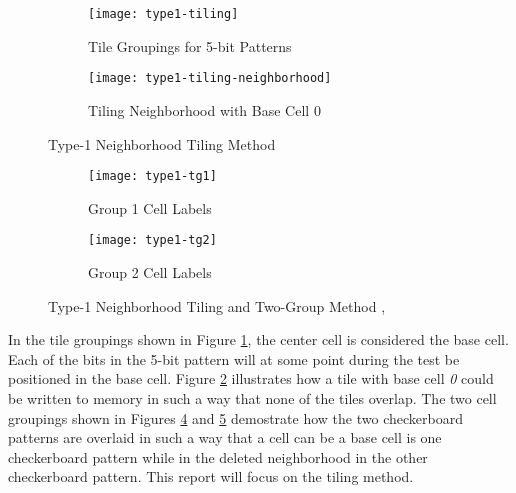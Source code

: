 \begin{figure}[H]
  \centering
  \begin{subfigure}[b]{0.4\textwidth}
    \texttt{[image: type1-tiling]}
    \caption{Tile Groupings for 5-bit Patterns}
    \label{fig:type1-tl}
  \end{subfigure}
  \begin{subfigure}[b]{0.4\textwidth}
    \texttt{[image: type1-tiling-neighborhood]}
    \caption{Tiling Neighborhood with Base Cell 0}
    \label{fig:type1-tlnh}
  \end{subfigure}
  \caption{Type-1 Neighborhood Tiling Method \cite{VanDeGoor1991}}
  \label{fig:type1tiling}
\end{figure}

\begin{figure}[H]
  \centering
  \begin{subfigure}[b]{0.4\textwidth}
    \texttt{[image: type1-tg1]}
    \caption{Group 1 Cell Labels}
    \label{fig:type1-tg1}
  \end{subfigure}
  \begin{subfigure}[b]{0.4\textwidth}
    \texttt{[image: type1-tg2]}
    \caption{Group 2 Cell Labels}
    \label{fig:type1-tg2}
  \end{subfigure}
  \caption{Type-1 Neighborhood Tiling and Two-Group Method \cite{1675601},\cite{1676572}}
  \label{fig:type1group}
\end{figure}

In the tile groupings shown in Figure \ref{fig:type1-tl}, the center cell is considered the base cell.  Each of the bits in the 5-bit pattern will at some point during the test be positioned in the base cell.  Figure \ref{fig:type1-tlnh} illustrates how a tile with base cell \textit{0} could be written to memory in such a way that none of the tiles overlap.  The two cell groupings shown in Figures \ref{fig:type1-tg1} and \ref{fig:type1-tg2} demostrate how the two checkerboard patterns are overlaid in such a way that a cell can be a base cell is one checkerboard pattern while in the deleted neighborhood in the other checkerboard pattern.  This report will focus on the tiling method.
